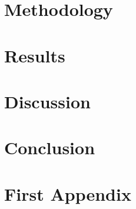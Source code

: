 \documentclass[a4paper,11pt]{report} %
\begin{document}
\chapter{Methodology}\label{cha:methodology}


\chapter{Results}\label{cha:results}


\chapter{Discussion}\label{cha:discussion}


\chapter{Conclusion}\label{cha:conclusion}

\cleardoublepage

%
%



\appendix

\chapter{First Appendix}\label{cha:appendix}

\end{document}
